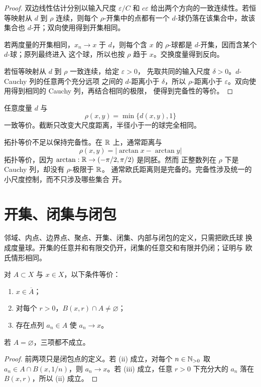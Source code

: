 \begin{proof}
双边线性估计分别以输入尺度 \(\varepsilon/C\) 和 \(c\varepsilon\)
给出两个方向的一致连续性。若恒等映射从 \(d\) 到 \(\rho\) 连续，则每个
\(\rho\)-开集中的点都有一个 \(d\)-球仍落在该集合中，故该集合也
\(d\)-开；双向使用得到开集相同。

若两度量的开集相同，\(x_n\to x\) 于 \(d\)，则每个含 \(x\) 的
\(\rho\)-球都是 \(d\)-开集，因而含某个 \(d\)-球；原列最终进入
这个球，所以也按 \(\rho\) 趋于 \(x\)。交换度量得到反向。

若恒等映射从 \(d\) 到 \(\rho\) 一致连续，给定 \(\varepsilon>0\)，
先取共同的输入尺度 \(\delta>0\)。\(d\)-Cauchy 列的任意两个充分远项
之间的 \(d\)-距离小于 \(\delta\)，所以 \(\rho\)-距离小于
\(\varepsilon\)。双向使用得到相同的 Cauchy 列，再结合相同的极限，
便得到完备性的等价。
\end{proof}

任意度量 \(d\) 与
\[
 \rho(x,y)=\min\{d(x,y),1\}
\]
一致等价。截断只改变大尺度距离，半径小于一的球完全相同。

拓扑等价不足以保持完备性。在 \(\mathbb{R}\) 上，通常距离与
\[
 \rho(x,y)=|\arctan x-\arctan y|
\]
拓扑等价，因为 \(\arctan:\mathbb{R}\to(-\pi/2,\pi/2)\) 是同胚。然而
正整数列在 \(\rho\) 下是 Cauchy 列，却没有 \(\rho\)-极限于 \(\mathbb{R}\)。
通常欧氏距离则是完备的。完备性涉及统一的小尺度控制，而不只涉及哪些集合
开。

\section{开集、闭集与闭包}

邻域、内点、边界点、聚点、开集、闭集、内部与闭包的定义，只需把欧氏球
换成度量球。开集的任意并和有限交仍开，闭集的任意交和有限并仍闭；证明与
欧氏情形相同。

\begin{theorem}[闭包的球刻画]
\label{thm:metric-closure-characterizations}
对 \(A\subset X\) 与 \(x\in X\)，以下条件等价：
\begin{enumerate}[label=\textup{(\roman*)}]
 \item \(x\in\overline A\)；
 \item 对每个 \(r>0\)，\(B(x,r)\cap A\ne\varnothing\)；
 \item 存在点列 \(a_n\in A\) 使 \(a_n\to x\)。
\end{enumerate}
若 \(A=\varnothing\)，三项都不成立。
\end{theorem}

\begin{proof}
前两项只是闭包点的定义。若 (ii) 成立，对每个 \(n\in\mathbb{N}_{>0}\) 取
\(a_n\in A\cap B(x,1/n)\)，则 \(a_n\to x\)。若 (iii) 成立，任意
\(r>0\) 下充分大的 \(a_n\) 落在 \(B(x,r)\)，所以 (ii) 成立。
\end{proof}


